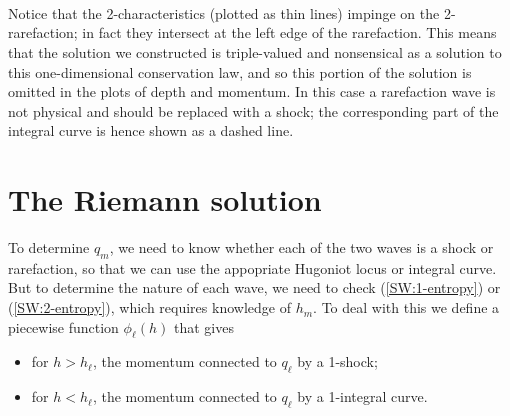 \documentclass{SIAMbook2016}
\providecommand{\tightlist}{%
      \setlength{\itemsep}{0pt}\setlength{\parskip}{0pt}}
\begin{document}
    \begin{center}
    \end{center}
    { \hspace*{\fill} \\}
    
    \begin{center}
    \end{center}
    { \hspace*{\fill} \\}
    
    \begin{center}
    \end{center}
    { \hspace*{\fill} \\}
    
Notice that the 2-characteristics (plotted as thin lines) impinge on the
2-rarefaction; in fact they intersect at the left edge of the
rarefaction. This means that the solution we constructed is
triple-valued and nonsensical as a solution to this one-dimensional
conservation law, and so this portion of the solution is omitted in the
plots of depth and momentum. In this case a rarefaction wave is not
physical and should be replaced with a shock; the corresponding part of
the integral curve is hence shown as a dashed line.

\hypertarget{the-riemann-solution}{%
\section{The Riemann solution}\label{the-riemann-solution}}

To determine \(q_m\), we need to know whether each of the two waves is a
shock or rarefaction, so that we can use the appopriate Hugoniot locus
or integral curve. But to determine the nature of each wave, we need to
check (\ref{SW:1-entropy}) or (\ref{SW:2-entropy}), which requires
knowledge of \(h_m\). To deal with this we define a piecewise function
\(\phi_\ell(h)\) that gives

\begin{itemize}
\tightlist
\item
  for \(h>h_\ell\), the momentum connected to \(q_\ell\) by a 1-shock;
\item
  for \(h<h_\ell\), the momentum connected to \(q_\ell\) by a 1-integral
  curve.
\end{itemize}
\end{document}
